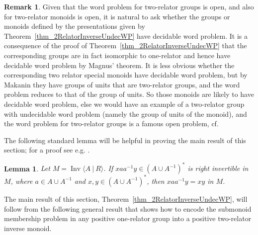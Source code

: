\documentclass{amsart}
\newcommand{\Ipres}[2]{\operatorname{Inv}\bigl\langle #1\:|\:#2 \bigr\rangle}
\theoremstyle{plain}
\newtheorem{lemma}[theorem]{Lemma}
\theoremstyle{definition}
\newtheorem{remark}[theorem]{Remark}
\begin{document}
\begin{remark} 
Given that the word problem for two-relator groups is open, and also for two-relator monoids is open, it is natural to ask whether the groups or monoids defined by the presentations given by Theorem~\ref{thm_2RelatorInverseUndecWP} have decidable word problem. It is a consequence of the proof of  Theorem~\ref{thm_2RelatorInverseUndecWP} that the corresponding groups are in fact isomorphic to one-relator and hence have decidable word problem by Magnus' theorem. It is less obvious whether the corresponding two relator special monoids have decidable word problem, but by Makanin \cite{Makanin1966, Makanin1966b} they have groups of units that are two-relator groups, and the word problem reduces to that of the group of units. So those monoids are likely to have decidable word problem, else we would have an example of a two-relator group with undecidable word problem (namely the group of units of the monoid), and the word problem for two-relator groups is a famous open problem, cf. \cite[Problem~9.29]{Kourovka2020}
  \end{remark}

The following standard lemma will be helpful in proving the main result of this section; for a proof see e.g. \cite[Corollary 3.2]{gray2020undecidability}.

\begin{lemma}\label{lem_reduce} 
Let $M = \Ipres{A}{R}$. 
If $xaa^{-1}y \in (A \cup A^{-1})^*$ is right invertible in $M$, where $a \in A \cup A^{-1}$ and
 $x, y \in (A \cup A^{-1})^*$, then $xaa^{-1}y=xy$ in $M$.   
  \end{lemma}

The main result of this section, Theorem~\ref{thm_2RelatorInverseUndecWP}, will follow from the following general result that shows how to encode the submonoid membership problem in any positive one-relator group into a positive two-relator inverse monoid. 
\end{document}
